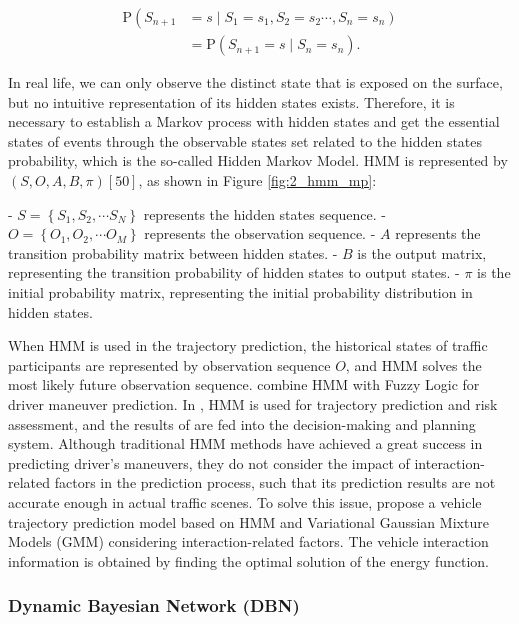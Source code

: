 \begin{equation}
	\begin{aligned}
		\mathrm{P}\left(S_{n+1}\right. & \left.=s \mid S_1=s_1, S_2=s_2 \cdots, S_n=s_n\right) \\
		& =\mathrm{P}\left(S_{n+1}=s \mid S_n=s_n\right) .
	\end{aligned}
\end{equation}

In real life, we can only observe the distinct state that is exposed on the surface, but no intuitive representation of its hidden states exists. Therefore, it is necessary to establish a Markov process with hidden states and get the essential states of events through the observable states set related to the hidden states probability, which is the so-called Hidden Markov Model. HMM is represented by $(S, O, A, B, \pi)[50]$, as shown in Figure \ref{fig:2_hmm_mp}:

- $S=\left\{S_1, S_2, \cdots S_N\right\}$ represents the hidden states sequence.
- $O=\left\{O_1, O_2, \cdots O_M\right\}$ represents the observation sequence.
- $A$ represents the transition probability matrix between hidden states.
- $B$ is the output matrix, representing the transition probability of hidden states to output states.
- $\pi$ is the initial probability matrix, representing the initial probability distribution in hidden states.

When HMM is used in the trajectory prediction, the historical states of traffic participants are represented by observation sequence $O$, and HMM solves the most likely future observation sequence. \cite{deng2018improved} combine HMM with Fuzzy Logic for driver maneuver prediction. In \cite{wang2021decision}, HMM is used for trajectory prediction and risk assessment, and the results of are fed into the decision-making and planning system. Although traditional HMM methods have achieved a great success in predicting driver’s maneuvers, they do not consider the impact of interaction-related factors in the prediction process, such that its prediction results are not accurate enough in actual traffic scenes. To solve this issue, \cite{deo2018would} propose a vehicle trajectory prediction model based on HMM and Variational Gaussian Mixture Models (GMM) considering interaction-related factors. The vehicle interaction information is obtained by finding the optimal solution of the energy function.

\subsubsection{Dynamic Bayesian Network (DBN)}
\label{subsubsec:2_dbn_mp}

